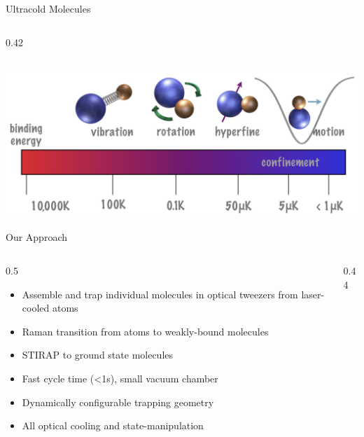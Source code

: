\documentclass[final]{beamer}
\newlength{\colonewid}
\begin{document}
\begin{frame}[t]
\begin{columns}[t]
\begin{column}{\colonewid}
\begin{block}{Ultracold Molecules}
\begin{columns}[T]
\begin{column}{0.42\colonewid}
          \end{column}
        \end{columns}
        \begin{center}
          \includegraphics[width=0.8\colonewid]{temp-scale}
        \end{center}
      \end{block}

      \begin{block}{Our Approach}
        \begin{columns}[T]
          \begin{column}{0.5\colonewid}
            \vspace{5ex}
            \begin{itemize}
            \item Assemble and trap individual molecules in optical tweezers
              from laser-cooled atoms
            \item Raman transition from atoms to weakly-bound molecules
            \item STIRAP to ground state molecules
            \end{itemize}
            \vspace{10ex}
            \textbf{\color{dblue}{Advantages}}
            \begin{itemize}
            \item Fast cycle time (<1s), small vacuum chamber
            \item Dynamically configurable trapping geometry
            \item All optical cooling and state-manipulation
            \end{itemize}
          \end{column}
          \begin{column}{0.44\colonewid}
\end{column}
\end{columns}
\end{block}
\end{column}
\end{columns}
\end{frame}
\end{document}
